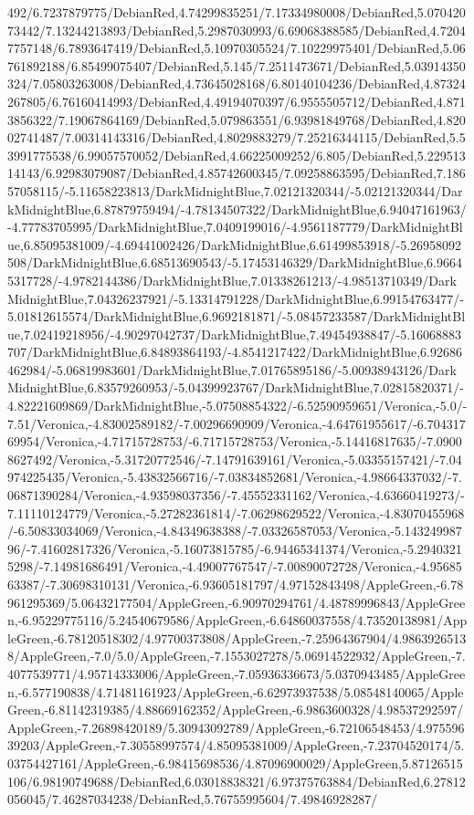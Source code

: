 {\begin{tikzternal}
492/6.7237879775/DebianRed,4.74299835251/7.17334980008/DebianRed,5.07042073442/7.13244213893/DebianRed,5.2987030993/6.69068388585/DebianRed,4.72047757148/6.7893647419/DebianRed,5.10970305524/7.10229975401/DebianRed,5.06761892188/6.85499075407/DebianRed,5.145/7.2511473671/DebianRed,5.03914350324/7.05803263008/DebianRed,4.73645028168/6.80140104236/DebianRed,4.87324267805/6.76160414993/DebianRed,4.49194070397/6.9555505712/DebianRed,4.8713856322/7.19067864169/DebianRed,5.079863551/6.93981849768/DebianRed,4.82002741487/7.00314143316/DebianRed,4.8029883279/7.25216344115/DebianRed,5.53991775538/6.99057570052/DebianRed,4.66225009252/6.805/DebianRed,5.22951314143/6.92983079087/DebianRed,4.85742600345/7.09258863595/DebianRed,7.18657058115/-5.11658223813/DarkMidnightBlue,7.02121320344/-5.02121320344/DarkMidnightBlue,6.87879759494/-4.78134507322/DarkMidnightBlue,6.94047161963/-4.77783705995/DarkMidnightBlue,7.0409199016/-4.9561187779/DarkMidnightBlue,6.85095381009/-4.69441002426/DarkMidnightBlue,6.61499853918/-5.26958092508/DarkMidnightBlue,6.68513690543/-5.17453146329/DarkMidnightBlue,6.96645317728/-4.9782144386/DarkMidnightBlue,7.01338261213/-4.98513710349/DarkMidnightBlue,7.04326237921/-5.13314791228/DarkMidnightBlue,6.99154763477/-5.01812615574/DarkMidnightBlue,6.9692181871/-5.08457233587/DarkMidnightBlue,7.02419218956/-4.90297042737/DarkMidnightBlue,7.49454938847/-5.16068883707/DarkMidnightBlue,6.84893864193/-4.8541217422/DarkMidnightBlue,6.92686462984/-5.06819983601/DarkMidnightBlue,7.01765895186/-5.00938943126/DarkMidnightBlue,6.83579260953/-5.04399923767/DarkMidnightBlue,7.02815820371/-4.82221609869/DarkMidnightBlue,-5.07508854322/-6.52590959651/Veronica,-5.0/-7.51/Veronica,-4.83002589182/-7.00296690909/Veronica,-4.64761955617/-6.70431769954/Veronica,-4.71715728753/-6.71715728753/Veronica,-5.14416817635/-7.09008627492/Veronica,-5.31720772546/-7.14791639161/Veronica,-5.03355157421/-7.04974225435/Veronica,-5.43832566716/-7.03834852681/Veronica,-4.98664337032/-7.06871390284/Veronica,-4.93598037356/-7.45552331162/Veronica,-4.63660419273/-7.11110124779/Veronica,-5.27282361814/-7.06298629522/Veronica,-4.83070455968/-6.50833034069/Veronica,-4.84349638388/-7.03326587053/Veronica,-5.14324998796/-7.41602817326/Veronica,-5.16073815785/-6.94465341374/Veronica,-5.29403215298/-7.14981686491/Veronica,-4.49007767547/-7.00890072728/Veronica,-4.9568563387/-7.30698310131/Veronica,-6.93605181797/4.97152843498/AppleGreen,-6.78961295369/5.06432177504/AppleGreen,-6.90970294761/4.48789996843/AppleGreen,-6.95229775116/5.24540679586/AppleGreen,-6.64860037558/4.73520138981/AppleGreen,-6.78120518302/4.97700373808/AppleGreen,-7.25964367904/4.98639265138/AppleGreen,-7.0/5.0/AppleGreen,-7.1553027278/5.06914522932/AppleGreen,-7.4077539771/4.95714333006/AppleGreen,-7.05936336673/5.0370943485/AppleGreen,-6.577190838/4.71481161923/AppleGreen,-6.62973937538/5.08548140065/AppleGreen,-6.81142319385/4.88669162352/AppleGreen,-6.9863600328/4.98537292597/AppleGreen,-7.26898420189/5.30943092789/AppleGreen,-6.72106548453/4.97559639203/AppleGreen,-7.30558997574/4.85095381009/AppleGreen,-7.23704520174/5.03754427161/AppleGreen,-6.98415698536/4.87096900029/AppleGreen,5.87126515106/6.98190749688/DebianRed,6.03018838321/6.97375763884/DebianRed,6.27812056045/7.46287034238/DebianRed,5.76755995604/7.49846928287/
\end{tikzternal}}
